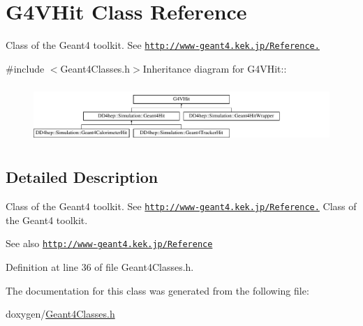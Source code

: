\hypertarget{class_g4_v_hit}{
\section{G4VHit Class Reference}
\label{class_g4_v_hit}
}


Class of the Geant4 toolkit. See \href{http://www-geant4.kek.jp/Reference.}{\tt http://www-\/geant4.kek.jp/Reference.}  


{\ttfamily \#include $<$Geant4Classes.h$>$}Inheritance diagram for G4VHit::\begin{figure}[H]
\begin{center}
\leavevmode
\includegraphics[height=2.19608cm]{class_g4_v_hit}
\end{center}
\end{figure}


\subsection{Detailed Description}
Class of the Geant4 toolkit. See \href{http://www-geant4.kek.jp/Reference.}{\tt http://www-\/geant4.kek.jp/Reference.} Class of the Geant4 toolkit. \begin{DoxySeeAlso}{See also}
\href{http://www-geant4.kek.jp/Reference}{\tt http://www-\/geant4.kek.jp/Reference} 
\end{DoxySeeAlso}


Definition at line 36 of file Geant4Classes.h.

The documentation for this class was generated from the following file:\begin{DoxyCompactItemize}
\item 
doxygen/\hyperlink{_geant4_classes_8h}{Geant4Classes.h}\end{DoxyCompactItemize}
